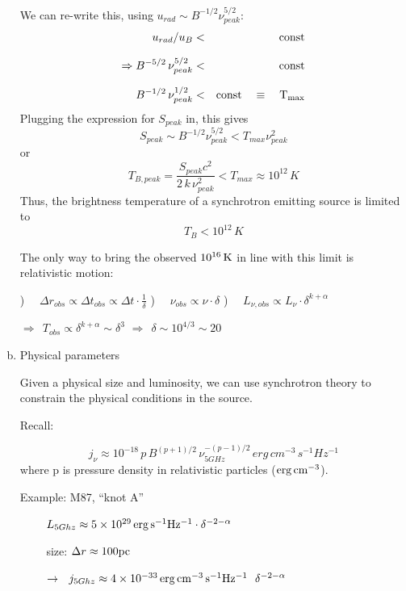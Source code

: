 \begin{enumerate}[a)]
We can re-write this, using $u_{rad} \sim B^{-1/2}\nu_{peak}^{5/2}$:
\begin{eqnarray}
   u_{rad} / u_{B} &<& \rm const \nonumnext
   \Rightarrow B^{-5/2}\, \nu_{peak}^{5/2} &<& \rm const \nonumnext
   B^{-1/2}\, \nu_{peak}^{1/2} &<& \rm const ~~~\equiv~~~ T_{max}
\end{eqnarray}
Plugging the expression for $S_{peak}$ in, this gives
\begin{equation}
   S_{peak} \sim B^{-1/2}\nu_{peak}^{5/2} < T_{max}\nu_{peak}^{2}
\end{equation}
or
\begin{equation}
   {T_{B,peak}} = \frac{S_{peak}c^{2}}{2\,k\,\nu_{peak}^{2}} < T_{max} \approx 10^{12}\,K
\end{equation}
Thus, the brightness temperature of a synchrotron emitting source is limited to 
\begin{equation}
   T_{B} < 10^{12}\, K
\end{equation}

The only way to bring the observed $10^{16} \rm\,K$ in line with this limit is relativistic motion:

   ) ~~$\Delta r_{obs} \propto \Delta t_{obs} \propto \Delta t \cdot \frac{1}{\delta} $
   ) ~~$\nu_{obs} \propto \nu\cdot \delta$
   ) ~~$L_{\nu,obs} \propto L_{\nu}\cdot \delta^{k+\alpha}$

   \subitem $\Rightarrow ~~ T_{obs} \propto \delta^{k+\alpha} \sim \delta^{3}$
   \subitem \textbf{$\Rightarrow ~~\delta \sim 10^{4/3} \sim 20 $}
               
   \item Physical parameters

   Given a physical size and luminosity, we can use synchrotron theory to constrain the physical conditions in the source.

   Recall:

\begin{equation}
   j_{\nu} \approx 10^{-18} \, p\,B^{(p+1)/2}\,\nu_{5GHz}^{-(p-1)/2} \, erg\,cm^{-3}\,s^{-1}Hz^{-1}
\end{equation}
where p is pressure density in relativistic particles (${\rm erg\,cm^{-3}}$).

   Example: M87, ``knot A''

   ~~~~ $L_{5Ghz} \approx 5\times10^{29} {\rm\,erg\,s^{-1}Hz^{-1}} \cdot \delta^{-2-\alpha}$

   ~~~~ size: $\Delta r \approx \rm 100 pc$

   ~~~~ $\rightarrow ~~ j_{5Ghz} \approx 4\times10^{-33} \,{\rm erg\,cm^{-3} \,s^{-1} Hz^{-1}} ~~\delta^{-2-\alpha}$ 


\end{enumerate}
